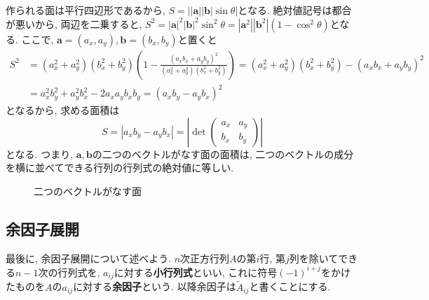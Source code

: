 \documentclass[a4j,dvipdfmx]{jsarticle}
\numberwithin{equation}{section}
\begin{document}
            作られる面は平行四辺形であるから, $S=\left||\bm{a}||\bm{b}|\sin\theta\right|$となる. 絶対値記号は都合が悪いから, 両辺を二乗すると,
            $S^2=|\bm{a}|^2|\bm{b}|^2\sin^2\theta=|\bm{a}^2||\bm{b}^2|(1-\cos^2\theta)$となる.
            ここで, $\bm{a}=(a_x,a_y),\bm{b}=(b_x,b_y)$と置くと
            \begin{align*}
                S^2&=(a_x^2+a_y^2)(b_x^2+b_y^2)\left(1-\frac{(a_xb_x+a_yb_y)^2}{(a_x^2+a_y^2)(b_x^2+b_y^2)}\right)=(a_x^2+a_y^2)(b_x^2+b_y^2)-(a_xb_x+a_yb_y)^2\\
                &=a_x^2b_y^2+a_y^2b_x^2-2a_xa_yb_xb_y=(a_xb_y-a_yb_x)^2
            \end{align*}
            となるから, 求める面積は
            \begin{equation}
                S=|a_xb_y-a_yb_x|=\left|\det\begin{pmatrix}
                    a_x & a_y \\ b_x & b_y
                \end{pmatrix}\right| \label{eq:線形代数:二つのベクトルがなす面の面積}
            \end{equation}
            となる. つまり, $\bm{a},\bm{b}$の二つのベクトルがなす面の面積は, 二つのベクトルの成分を横に並べてできる行列の行列式の絶対値に等しい.
            \begin{figure}[h]
                \centering
                \caption{二つのベクトルがなす面}
            \end{figure}
        \clearpage
        \subsection{余因子展開}
            最後に, 余因子展開について述べよう. $n$次正方行列$A$の第$i$行, 第$j$列を除いてできる$n-1$次の行列式を, $a_{ij}$に対する\textbf{小行列式}といい, 
            これに符号$(-1)^{i+j}$をかけたものを$A$の$a_{ij}$に対する\textbf{余因子}という. 以降余因子は$\tilde{A}_{ij}$と書くことにする.\\
\end{document}
